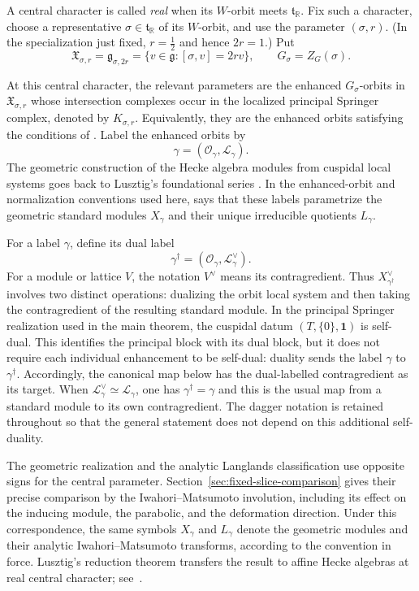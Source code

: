 \documentclass[11pt]{amsart}
\theoremstyle{definition}
\theoremstyle{remark}
\begin{document}
A central character is called \emph{real} when its $W$-orbit meets
$\mathfrak t_{\mathbb R}$.  Fix such a character, choose a 
representative $\sigma\in\mathfrak t_{\mathbb R}$ of its $W$-orbit, and use
the parameter $(\sigma,r)$.  (In the
specialization just fixed, $r=\tfrac12$ and hence $2r=1$.)
Put
\[
 \mathfrak X_{\sigma,r}=\mathfrak g_{\sigma,2r}
 =\{v\in\mathfrak g:[\sigma,v]=2rv\},
 \qquad G_\sigma=Z_G(\sigma).
\]

At this central character, the relevant parameters are the enhanced
$G_\sigma$-orbits in $\mathfrak X_{\sigma,r}$ whose intersection complexes
occur in the localized principal Springer complex, denoted by
$K_{\sigma,r}$.  Equivalently, they are the enhanced orbits
satisfying the conditions of
\cite[Proposition~4.1]{Solleveld}.  Label the enhanced orbits by
\[
 \gamma=(\mathcal O_\gamma,\mathcal L_\gamma).
\]
The geometric construction of the Hecke algebra modules from cuspidal local systems goes
back to Lusztig's foundational series
\cite{LusztigCuspidalI,LusztigCuspidalII,LusztigCuspidalIII}.  In the
enhanced-orbit and normalization conventions used here,
\cite[Theorem~3.2(a),(c) and Theorem~4.2(a)]{Solleveld} says that these labels
parametrize the geometric standard modules $X_\gamma$ and their unique
irreducible quotients $L_\gamma$.
\begin{samepage}
For a label $\gamma$, define its dual label
\[
 \gamma^\dagger=(\mathcal O_\gamma,\mathcal L_\gamma^\vee).
\]
For a module or lattice $V$, the notation $V^\vee$ means its contragredient.
Thus $X_{\gamma^\dagger}^\vee$ involves two distinct operations: dualizing the
orbit local system and then taking the contragredient of the resulting
standard module.
In the principal Springer realization used in the main theorem, the
cuspidal datum $(T,\{0\},\mathbf1)$ is self-dual.  This identifies the
principal block with its dual block, but it does not require each individual
enhancement to be self-dual: duality sends the label $\gamma$ to
$\gamma^\dagger$.  Accordingly, the canonical map below has the
dual-labelled contragredient as its target.  When
$\mathcal L_\gamma^\vee\simeq\mathcal L_\gamma$, one has
$\gamma^\dagger=\gamma$ and this is the usual map from a standard module to
its own contragredient.  The dagger notation is retained throughout so that
the general statement does not depend on this additional self-duality.
\end{samepage}

The geometric realization and the analytic Langlands classification use
opposite signs for the central parameter.  Section~\ref{sec:fixed-slice-comparison} gives
their precise comparison by the Iwahori--Matsumoto involution, including its
effect on the inducing module, the parabolic, and the deformation direction.
Under this correspondence, the same
symbols $X_\gamma$ and $L_\gamma$ denote the geometric modules and their
analytic Iwahori--Matsumoto transforms, according to the convention in
force.  Lusztig's reduction
theorem transfers the result to affine Hecke algebras at real central
character; see~\cite[Theorem~9.3 and Section~10.9]{LusztigReduction}.
\end{document}
